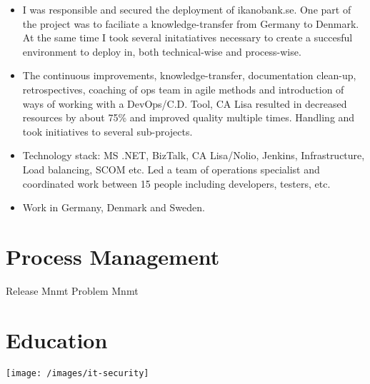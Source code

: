 \documentclass[11pt,a4paper,sans]{moderncv}
\begin{document}
\begin{itemize}
    \item I was responsible and secured the deployment of ikanobank.se. One part of the project was to faciliate a knowledge-transfer from Germany to Denmark. At the same time I took several initatiatives necessary to create a succesful environment to deploy in, both technical-wise and process-wise. 
    
    \item The continuous improvements, knowledge-transfer, documentation clean-up, retrospectives, coaching of ops team in agile methods and introduction of ways of working with a DevOps/C.D. Tool, CA Lisa resulted in decreased resources by about 75\% and improved quality multiple times. Handling and took initiatives to several sub-projects. 
    
    \item Technology stack: MS .NET, BizTalk, CA Lisa/Nolio, Jenkins, Infrastructure, Load balancing, SCOM etc. Led a team of operations specialist and coordinated work between 15 people including developers, testers, etc. 
    
    \item Work in Germany, Denmark and Sweden. 
\end{itemize}

\section{Process Management}
 {Release Mnmt}
 {Problem Mnmt}


\section{Education}
\texttt{[image: /images/it-security]}
\end{document}
